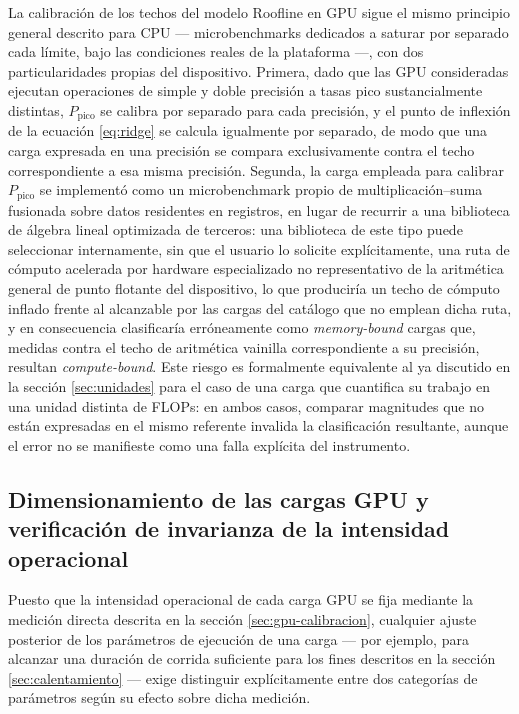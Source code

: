 \documentclass[12pt,oneside,spanish]{book}
\begin{document}
La calibración de los techos del modelo Roofline en GPU sigue el mismo principio general descrito para CPU --- microbenchmarks dedicados a saturar por separado cada límite, bajo las condiciones reales de la plataforma ---, con dos particularidades propias del dispositivo. Primera, dado que las GPU consideradas ejecutan operaciones de simple y doble precisión a tasas pico sustancialmente distintas, $P_{\text{pico}}$ se calibra por separado para cada precisión, y el punto de inflexión de la ecuación \eqref{eq:ridge} se calcula igualmente por separado, de modo que una carga expresada en una precisión se compara exclusivamente contra el techo correspondiente a esa misma precisión. Segunda, la carga empleada para calibrar $P_{\text{pico}}$ se implementó como un microbenchmark propio de multiplicación--suma fusionada sobre datos residentes en registros, en lugar de recurrir a una biblioteca de álgebra lineal optimizada de terceros: una biblioteca de este tipo puede seleccionar internamente, sin que el usuario lo solicite explícitamente, una ruta de cómputo acelerada por hardware especializado no representativo de la aritmética general de punto flotante del dispositivo, lo que produciría un techo de cómputo inflado frente al alcanzable por las cargas del catálogo que no emplean dicha ruta, y en consecuencia clasificaría erróneamente como \textit{memory-bound} cargas que, medidas contra el techo de aritmética vainilla correspondiente a su precisión, resultan \textit{compute-bound}. Este riesgo es formalmente equivalente al ya discutido en la sección \ref{sec:unidades} para el caso de una carga que cuantifica su trabajo en una unidad distinta de FLOPs: en ambos casos, comparar magnitudes que no están expresadas en el mismo referente invalida la clasificación resultante, aunque el error no se manifieste como una falla explícita del instrumento.

\subsection{Dimensionamiento de las cargas GPU y verificación de invarianza de la intensidad operacional}
\label{sec:dimensionamiento}

Puesto que la intensidad operacional de cada carga GPU se fija mediante la medición directa descrita en la sección \ref{sec:gpu-calibracion}, cualquier ajuste posterior de los parámetros de ejecución de una carga --- por ejemplo, para alcanzar una duración de corrida suficiente para los fines descritos en la sección \ref{sec:calentamiento} --- exige distinguir explícitamente entre dos categorías de parámetros según su efecto sobre dicha medición.
\end{document}
